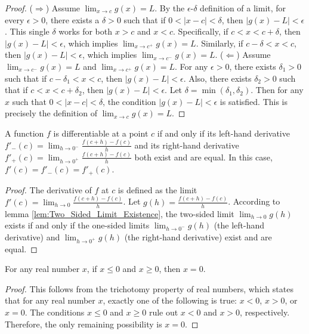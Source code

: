 \begin{proof}
    ($\Rightarrow$) Assume $\lim_{x \to c} g(x) = L$. By the $\epsilon$-$\delta$ definition of a limit, for every $\epsilon > 0$, there exists a $\delta > 0$ such that if $0 < |x-c| < \delta$, then $|g(x)-L| < \epsilon$. This single $\delta$ works for both $x > c$ and $x < c$. Specifically, if $c < x < c+\delta$, then $|g(x)-L| < \epsilon$, which implies $\lim_{x \to c^+} g(x) = L$. Similarly, if $c-\delta < x < c$, then $|g(x)-L| < \epsilon$, which implies $\lim_{x \to c^-} g(x) = L$.
    ($\Leftarrow$) Assume $\lim_{x \to c^-} g(x) = L$ and $\lim_{x \to c^+} g(x) = L$. For any $\epsilon > 0$, there exists $\delta_1 > 0$ such that if $c-\delta_1 < x < c$, then $|g(x)-L| < \epsilon$. Also, there exists $\delta_2 > 0$ such that if $c < x < c+\delta_2$, then $|g(x)-L| < \epsilon$. Let $\delta = \min(\delta_1, \delta_2)$. Then for any $x$ such that $0 < |x-c| < \delta$, the condition $|g(x)-L| < \epsilon$ is satisfied. This is precisely the definition of $\lim_{x \to c} g(x) = L$.
\end{proof}

\begin{lemma}
    \label{lem:Condition_for_Differentiability}
    A function $f$ is differentiable at a point $c$ if and only if its left-hand derivative $f'_-(c) = \lim_{h \to 0^-} \frac{f(c+h)-f(c)}{h}$ and its right-hand derivative $f'_+(c) = \lim_{h \to 0^+} \frac{f(c+h)-f(c)}{h}$ both exist and are equal. In this case, $f'(c) = f'_-(c) = f'_+(c)$.
\end{lemma}

\begin{proof}
    The derivative of $f$ at $c$ is defined as the limit $f'(c) = \lim_{h \to 0} \frac{f(c+h)-f(c)}{h}$. Let $g(h) = \frac{f(c+h)-f(c)}{h}$. According to lemma \ref{lem:Two_Sided_Limit_Existence}, the two-sided limit $\lim_{h \to 0} g(h)$ exists if and only if the one-sided limits $\lim_{h \to 0^-} g(h)$ (the left-hand derivative) and $\lim_{h \to 0^+} g(h)$ (the right-hand derivative) exist and are equal.
\end{proof}

\begin{lemma}
    \label{lem:Trichotomy_Property_Consequence}
    For any real number $x$, if $x \leq 0$ and $x \geq 0$, then $x=0$.
\end{lemma}

\begin{proof}
    This follows from the trichotomy property of real numbers, which states that for any real number $x$, exactly one of the following is true: $x < 0$, $x > 0$, or $x = 0$. The conditions $x \leq 0$ and $x \geq 0$ rule out $x < 0$ and $x > 0$, respectively. Therefore, the only remaining possibility is $x=0$.
\end{proof}

